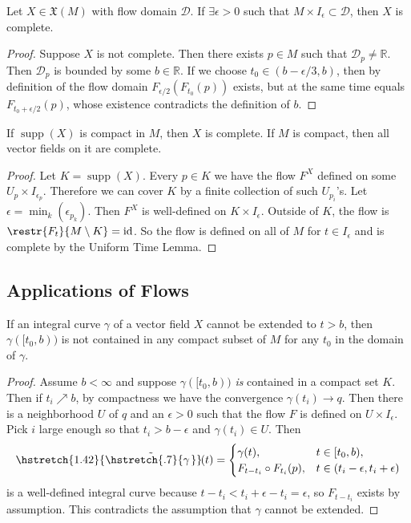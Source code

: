 \documentclass[english,letterpaper]{article}%
\numberwithin{equation}{section}
\numberwithin{figure}{section}
\numberwithin{table}{section}
\theoremstyle{definition}
\theoremstyle{definition}
\theoremstyle{definition}
\theoremstyle{plain}
\theoremstyle{plain}
\theoremstyle{plain}
\theoremstyle{plain}
\theoremstyle{remark}
\theoremstyle{remark}
\DeclareMathOperator{\id}{id}
\DeclareMathOperator{\supp}{supp}
\newcommand{\fX}{\mathfrak{X}}
\newcommand\wt[1]{\hstretch{1.42}{\tilde{\hstretch{.7}{#1\mkern2mu}}}\mkern-2mu}
\begin{document}
\begin{thm}
Let $X\in\fX(M)$ with flow domain $\mathcal{D}$. If $\exists\epsilon>0$ such that $M\times I_\epsilon\subset\mathcal{D}$, then $X$ is complete.
\end{thm}
\begin{proof}
Suppose $X$ is not complete. Then there exists $p\in M$ such that $\mathcal{D}_p\neq \mathbb{R}$. Then $\mathcal{D}_p$ is bounded by some $b\in\mathbb{R}$. If we choose $t_0\in(b-\epsilon/3,b)$, then by definition of the flow domain $F_{\epsilon/2}(F_{t_0}(p))$ exists, but at the same time equals $F_{t_0+\epsilon/2}(p)$, whose existence contradicts the definition of $b$.
\end{proof}
\begin{cor}
If $\supp (X)$ is compact in $M$, then $X$ is complete. If $M$ is compact, then all vector fields on it are complete.
\end{cor}
\begin{proof}
Let $K=\supp(X)$. Every $p\in K$ we have the flow $F^X$ defined on some $U_p\times I_{\epsilon_p}$. Therefore we can cover $K$ by a finite collection of such $U_{p_i}$'s. Let $\epsilon=\min_k(\epsilon_{p_k})$. Then $F^X$ is well-defined on $K\times I_\epsilon$. Outside of $K$, the flow is $\restr{F_t}{M\setminus K}=\id$. So the flow is defined on all of $M$ for $t\in I_\epsilon$ and is complete by the Uniform Time Lemma.
\end{proof}


\subsection{Applications of Flows}

\begin{lem}
If an integral curve $\gamma$ of a vector field $X$ cannot be extended to $t>b$, then $\gamma([t_0,b))$ is not contained in any compact subset of $M$ for any $t_0$ in the domain of $\gamma$.
\end{lem}
\begin{proof}
Assume $b<\infty$ and suppose $\gamma([t_0,b))$ \emph{is} contained in a compact set $K$. Then if $t_i\nearrow b$, by compactness we have the convergence $\gamma(t_i)\to q$. Then there is a neighborhood $U$ of $q$ and an $\epsilon>0$ such that the flow $F$ is defined on $U\times I_\epsilon$. Pick $i$ large enough so that $t_i>b-\epsilon$ and $\gamma(t_i)\in U$. Then 
\[
\wt{\gamma}(t)=\begin{cases} \gamma(t), & t\in[t_0,b),\\ F_{t-t_i}\circ F_{t_i}(p), & t\in (t_i-\epsilon,t_i+\epsilon)   \end{cases}
\]
is a well-defined integral curve because $t-t_i<t_i+\epsilon-t_i=\epsilon$, so $F_{t-t_i}$ exists by assumption. This contradicts the assumption that $\gamma $ cannot be extended.
\end{proof}
\end{document}
